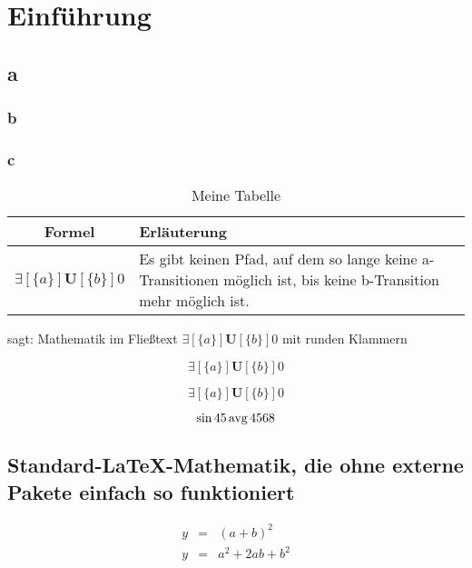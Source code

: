 \chapter{Einführung}

\section{a}
\subsection{b}
\subsection{c}

\blindtext[5]


\begin{table}[ht]
\begin{center}
\begin{tabular}{cp{}} \toprule
\textbf{Formel} & \textbf{Erläuterung} \\ \midrule
\( \exists[\{a\}]\mathbf{U} [\{b\}]0 \) & Es gibt keinen Pfad, auf dem so lange keine a-Transitionen möglich ist, bis keine b-Transition mehr möglich ist.\\
\end{tabular}
\end{center}
\caption{Meine Tabelle}\label{tab:meine}
\end{table}

 sagt: 
Mathematik im Fließtext \( \exists[\{a\}]\mathbf{U} [\{b\}]0 \)  mit runden Klammern 

\[ \exists[\{a\}]\mathbf{U} [\{b\}]0 \]

\begin{equation}
\exists[\{a\}]\mathbf{U} [\{b\}]0
\end{equation}

\begin{equation}
\sin 45 \avg 4568
\end{equation}

\section[Standard-\LaTeX-Mathematik]{Standard-\LaTeX-Mathematik, die ohne externe Pakete einfach so funktioniert}

\begin{eqnarray} %
y &=& (a + b)^2 \\
y &=& a^2 + 2ab +b^2
\end{eqnarray}

